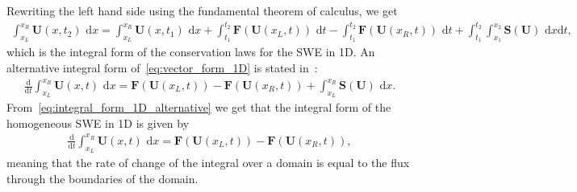Rewriting the left hand side using the fundamental theorem of calculus, we get
\begin{align}\label{eq:integral_form_1D_final}
    \int_{x_L}^{x_R} \mathbf{U}(x, t_2) \text{ d}x =
    \int_{x_L}^{x_R}  \mathbf{U}(x, t_1) \text{ d}x + \int_{t_1}^{t_2} \mathbf{F}(\mathbf{U}(x_L, t)) \text{ d}t - \int_{t_1}^{t_2} \mathbf{F}(\mathbf{U}(x_R, t)) \text{ d}t + \int_{t_1}^{t_2} \int_{x_1}^{x_2} \mathbf{S(U)} \text{ d}x \text{d}t,
\end{align}
which is the integral form of the conservation laws for the SWE in 1D.
An alternative integral form of~\eqref{eq:vector_form_1D} is stated in~\cite{Toro2024}:
\begin{align}\label{eq:integral_form_1D_alternative}
    \frac{\text{d}}{\text{d}t} \int_{x_L}^{x_R} \mathbf{U}(x,t) \text{ d}x = \mathbf{F}(\mathbf{U}(x_L, t)) - \mathbf{F}(\mathbf{U}(x_R, t)) + \int_{x_L}^{x_R} \mathbf{S}(\mathbf{U}) \text{ d}x.
\end{align}
From~\eqref{eq:integral_form_1D_alternative} we get that the integral form of the homogeneous SWE in 1D is given by
\begin{align}\label{eq:integral_form_1D_homogeneous}
    \frac{\text{d}}{\text{d}t} \int_{x_L}^{x_R} \mathbf{U}(x,t) \text{ d}x = \mathbf{F}(\mathbf{U}(x_L, t)) - \mathbf{F}(\mathbf{U}(x_R, t)),
\end{align}
meaning that the rate of change of the integral over a domain is equal to the flux through the boundaries of the domain.


